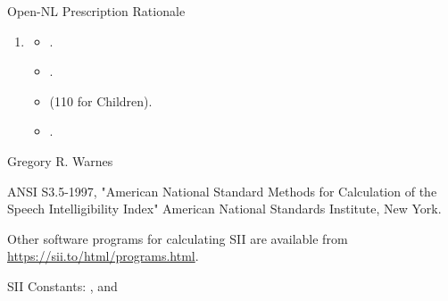 \documentclass[letterpaper]{book}
\begin{document}
\begin{Section}{Open-NL Prescription Rationale}
\begin{enumerate}
\begin{itemize}
\item{} \emph{Demographic Boosts:} Child Boost: Interpolates  dB. Gender: Female  dB. Config: Unilateral  dB. Experience: New users with  get up to  dB penalty.
\item{} \emph{LDL Dynamic Range Mapping:} If  is provided, dynamic range is evaluated. For every 1 dB the measured LDL is lower than predicted,  is reduced by 0.2 dB and  is increased by 0.02.
\item{} \emph{Acoustic Coupling:} Subtracts vent leakage (e.g., Open Dome  dB).
\item{} Applies a 3-point moving average to the final gain array.

\end{itemize}

\item{}  
\begin{itemize}

\item{} .
\item{} .
\item{}  (110 for Children).
\item{} .

\end{itemize}


\end{enumerate}

\end{Section}
%
\begin{Author}
Gregory R. Warnes 
\end{Author}
%
\begin{References}
ANSI S3.5-1997, "American National Standard Methods for 
Calculation of the Speech Intelligibility Index" American National
Standards Institute, New York. 

Other software programs for calculating SII are available from
\url{https://sii.to/html/programs.html}.

\end{References}
%
\begin{SeeAlso}
 SII Constants: , and
\end{SeeAlso}
\end{document}
